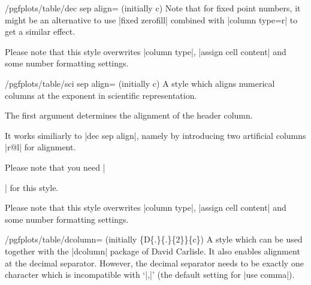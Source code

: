 \begin{stylekey}{/pgfplots/table/dec sep align= (initially c)}
	Note that for fixed point numbers, it might be an alternative to use |fixed zerofill| combined with |column type=r| to get a similar effect.

	Please note that this style overwrites |column type|, |assign cell content| and some number formatting settings.
\end{stylekey}

% 
 
% 
% 
% 

\begin{stylekey}{/pgfplots/table/sci sep align= (initially c)}
	A style which aligns numerical columns at the exponent in scientific representation.

	The first argument determines the alignment of the header column. 

	It works similiarly to |dec sep align|, namely by introducing two artificial columns |r@{}l| for alignment.
	
	Please note that you need |\usepackage{array}| for this style.

	Please note that this style overwrites |column type|, |assign cell content| and some number formatting settings.
\end{stylekey}

\begin{stylekey}{/pgfplots/table/dcolumn= (initially \{D\{.\}\{.\}\{2\}\}\{c\})}
	A style which can be used together with the |dcolumn| package of David Carlisle. It also enables alignment at the decimal separator. However, the decimal separator needs to be exactly one character which is incompatible with `|{,}|' (the default setting for |use comma|).
\end{stylekey}

